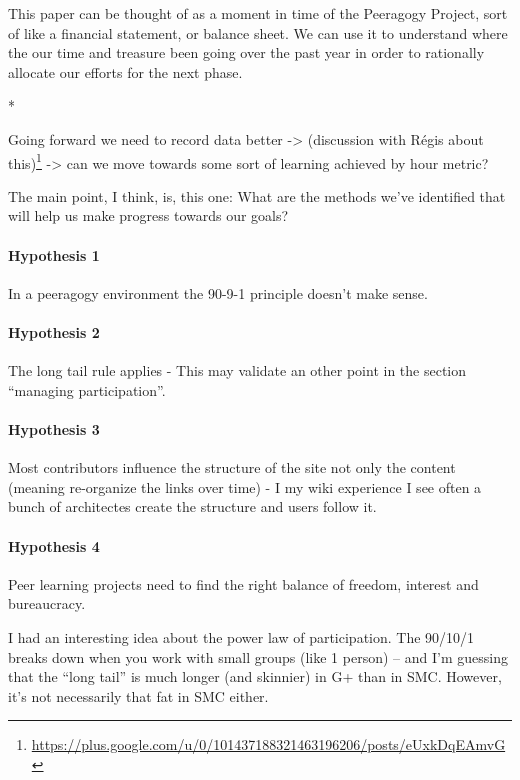 \documentclass{acm_proc_article-sp}
\begin{document}
This paper can be thought of as a moment in time of the Peeragogy Project, sort of like a financial statement, or balance sheet. We can use it to understand where the our time and treasure been going over the past year in order to rationally allocate our efforts for the next phase.

\begin{center}
*
\end{center}

Going forward we need to record data better -> (discussion with
R\'egis about
this)\footnote{\url{https://plus.google.com/u/0/101437188321463196206/posts/eUxkDqEAmvG}}
-> can we move towards some sort of learning achieved by hour metric?

The main point, I think, is, this one: What are the methods we've
identified that will help us make progress towards our goals?

\paragraph{Hypothesis 1}
In a peeragogy environment the 90-9-1 principle doesn't make sense.

\paragraph{Hypothesis 2} The long tail rule applies - This may validate
an other point in the section ``managing participation''.

\paragraph{Hypothesis 3} Most contributors influence the structure of the site not only the content (meaning re-organize the links over time) - I my wiki experience I see often a bunch of architectes create the structure and users follow it.

\paragraph{Hypothesis 4} Peer learning projects need to find the right balance of freedom, interest and bureaucracy.

I had an interesting idea about the power law of participation. The 90/10/1 breaks down when you work with small groups (like 1 person) -- and I'm guessing that the ``long tail'' is much longer (and skinnier) in G+ than in SMC. However, it's not necessarily that fat in SMC either.
\end{document}

